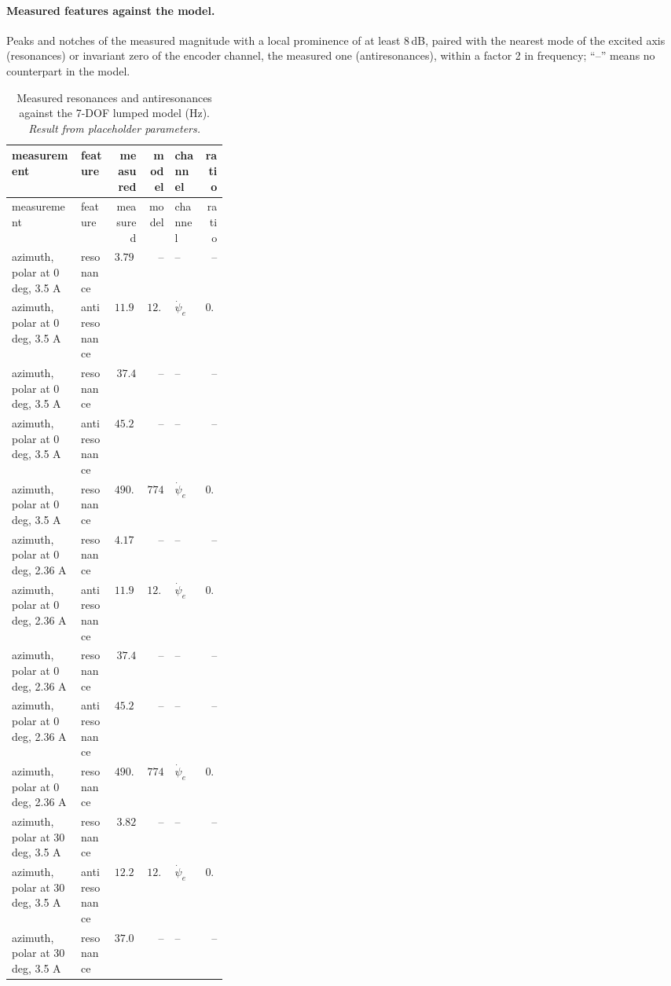 \documentclass[10pt,a4paper]{article}
\numberwithin{equation}{section}
\begin{document}
\paragraph{Measured features against the model.} Peaks and notches of the measured magnitude with a local prominence of at least 8\,dB, paired with the nearest mode of the excited axis (resonances) or invariant zero of the encoder channel, the measured one (antiresonances), within a factor 2 in frequency; ``--'' means no counterpart in the model.
\begin{longtable}{p{0.32\linewidth}lrrlr}
\caption{Measured resonances and antiresonances against the 7-DOF lumped model (Hz). \emph{Result from placeholder parameters.}}\label{tab:exp_features}\\
\toprule measurement & feature & measured & model & channel & ratio \\ \midrule\endfirsthead
\toprule measurement & feature & measured & model & channel & ratio \\ \midrule\endhead
azimuth, polar at 0 deg, 3.5 A & resonance & $3.797$ & -- & -- & -- \\
azimuth, polar at 0 deg, 3.5 A & antiresonance & $11.92$ & $12.38$ & $\dot\psi_e$ & $0.963$ \\
azimuth, polar at 0 deg, 3.5 A & resonance & $37.4$ & -- & -- & -- \\
azimuth, polar at 0 deg, 3.5 A & antiresonance & $45.26$ & -- & -- & -- \\
azimuth, polar at 0 deg, 3.5 A & resonance & $490.4$ & $774$ & $\dot\psi_e$ & $0.634$ \\
azimuth, polar at 0 deg, 2.36 A & resonance & $4.177$ & -- & -- & -- \\
azimuth, polar at 0 deg, 2.36 A & antiresonance & $11.92$ & $12.38$ & $\dot\psi_e$ & $0.963$ \\
azimuth, polar at 0 deg, 2.36 A & resonance & $37.4$ & -- & -- & -- \\
azimuth, polar at 0 deg, 2.36 A & antiresonance & $45.26$ & -- & -- & -- \\
azimuth, polar at 0 deg, 2.36 A & resonance & $490.4$ & $774$ & $\dot\psi_e$ & $0.634$ \\
azimuth, polar at 30 deg, 3.5 A & resonance & $3.82$ & -- & -- & -- \\
azimuth, polar at 30 deg, 3.5 A & antiresonance & $12.25$ & $12.86$ & $\dot\psi_e$ & $0.953$ \\
azimuth, polar at 30 deg, 3.5 A & resonance & $37.06$ & -- & -- & -- \\

\end{longtable}
\end{document}
